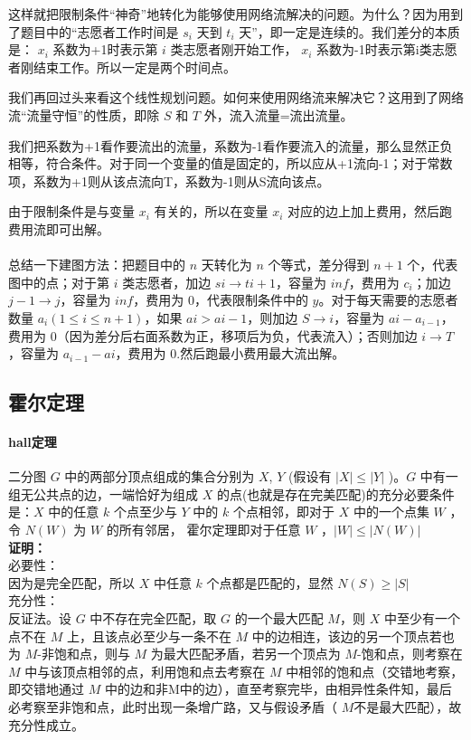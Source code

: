 	这样就把限制条件“神奇”地转化为能够使用网络流解决的问题。为什么？因为用到了题目中的“志愿者工作时间是 $s_i$ 天到 $t_i$ 天”，即一定是连续的。我们差分的本质是： $x_i$ 系数为+1时表示第 $i$ 类志愿者刚开始工作， $x_i$ 系数为-1时表示第i类志愿者刚结束工作。所以一定是两个时间点。
	
	我们再回过头来看这个线性规划问题。如何来使用网络流来解决它？这用到了网络流“流量守恒”的性质，即除 $S$ 和 $T$ 外，流入流量=流出流量。
	
	我们把系数为+1看作要流出的流量，系数为-1看作要流入的流量，那么显然正负相等，符合条件。对于同一个变量的值是固定的，所以应从+1流向-1；对于常数项，系数为+1则从该点流向T，系数为-1则从S流向该点。
	
	由于限制条件是与变量 $x_i$ 有关的，所以在变量 $x_i$ 对应的边上加上费用，然后跑费用流即可出解。\\
	~\\
	
	总结一下建图方法：把题目中的 $n$ 天转化为 $n$ 个等式，差分得到 $n+1$ 个，代表图中的点；对于第 $i$ 类志愿者，加边 $si\rightarrow ti+1$，容量为 $inf$，费用为 $c_i$；加边 $j-1\rightarrow j$，容量为 $inf$，费用为 $0$，代表限制条件中的 $y$。对于每天需要的志愿者数量 $a_i(1\le i\le n+1)$，如果 $ai>ai−1$，则加边 $S\rightarrow i$，容量为 $ai−a_{i−1}$，费用为 $0$（因为差分后右面系数为正，移项后为负，代表流入）；否则加边 $i\rightarrow T$，容量为 $a_{i−1}−ai$，费用为 $0$.然后跑最小费用最大流出解。
	\newpage
	\subsection{霍尔定理}
	\paragraph{hall定理}二分图 $G$ 中的两部分顶点组成的集合分别为 $X$, $Y$ (假设有 $|X|\le|Y|$ )。$G$ 中有一组无公共点的边，一端恰好为组成 $X$ 的点(也就是存在完美匹配)的充分必要条件是：$X$ 中的任意 $k$ 个点至少与 $Y$ 中的 $k$ 个点相邻，即对于 $X$ 中的一个点集 $W$ ，令 $N(W)$ 为 $W$ 的所有邻居， 霍尔定理即对于任意 $W$ ，$|W|\le|N(W)|$\\
	\textbf{证明：}\\
	必要性：\\
	因为是完全匹配，所以 $X$ 中任意 $k$ 个点都是匹配的，显然 $N(S)\ge|S|$\\
	充分性：\\
	反证法。设 $G$ 中不存在完全匹配，取 $G$ 的一个最大匹配 $M$，则 $X$ 中至少有一个点不在 $M$ 上，且该点必至少与一条不在 $M$ 中的边相连，该边的另一个顶点若也为 $M$-非饱和点，则与 $M$ 为最大匹配矛盾，若另一个顶点为 $M$-饱和点，则考察在 $M$ 中与该顶点相邻的点，利用饱和点去考察在 $M$ 中相邻的饱和点（交错地考察，即交错地通过 $M$ 中的边和非M中的边），直至考察完毕，由相异性条件知，最后必考察至非饱和点，此时出现一条增广路，又与假设矛盾（ $M$不是最大匹配），故充分性成立。\\
